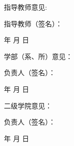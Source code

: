 \begin{commentCell}
  指导教师意见:
    \vspace{4cm}
    \begin{flushright}
      指导教师（签名）：
      \coverunderline[3cm]{}
      \qquad \qquad

      年 \quad 月 \quad 日
    \end{flushright}
    \vspace{2cm}
\end{commentCell}
\begin{commentCell}
  学部（系、所）意见：
    \vspace{2cm}
    \begin{flushright}
      负责人（签名）：
      \coverunderline[3cm]{}
      \qquad \qquad

      年 \quad 月 \quad 日
    \end{flushright}
    \vspace{2cm}
\end{commentCell}
\begin{commentCell}
  二级学院意见：
    \vspace{2cm}
    \begin{flushright}
      负责人（签名）：
      \coverunderline[3cm]{}
      \qquad \qquad

      年 \quad 月 \quad 日
    \end{flushright}
    \vspace{2cm}
\end{commentCell}
\begin{tablenotes}
  \item {}
\end{tablenotes}
